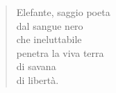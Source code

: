 
\begin{verse}
    Elefante, saggio poeta\\
    dal sangue nero\\
    che ineluttabile\\
    penetra la viva terra\\
    di savana\\
    di libertà.
\end{verse}